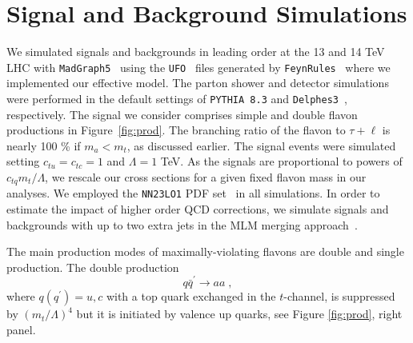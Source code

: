 \documentclass[prd,amsfonts,onecolumn,superscriptaddress,aps,nofootinbib,11pt]{revtex4-1}
\begin{document}
\section{Signal and Background Simulations}\label{backs}

We simulated signals and backgrounds in leading order at the 13 and 14 TeV LHC with \texttt{MadGraph5}~\cite{Alwall:2014hca, Frederix:2018nkq} using the \texttt{UFO}~\cite{Degrande:2011ua} files generated by \texttt{FeynRules}~\cite{Alloul:2013bka} where we implemented our effective model.  The parton shower and detector simulations were performed in the default settings of \texttt{PYTHIA 8.3} \cite{Bierlich:2022pfr} and \texttt{Delphes3}~\cite{deFavereau:2013fsa}, respectively. The signal we consider comprises simple and double flavon productions in Figure~\ref{fig:prod}. The branching ratio of the flavon to $\tau+\ell$ is nearly 100 \% if $m_a<m_t$, as discussed earlier. The signal events were simulated setting $c_{tu}=c_{tc}=1$ and $\Lambda=1$ TeV. As the signals are proportional to powers of $c_{tq} m_t/\Lambda$, we rescale our cross sections for a given fixed flavon mass in our analyses. We employed the \texttt{NN23LO1} PDF set~\cite{Ball_2017} in all simulations. In order to estimate the impact of higher order QCD corrections, we simulate signals and backgrounds with up to two extra jets in the MLM merging approach~\cite{Mangano_2007}.





The main production modes of maximally-violating flavons are double and single production.
The double production
\begin{equation}
    q\bar{q}^\prime \to aa\; ,
\end{equation}
where $q(q^\prime)=u,c$ with a top quark exchanged in the $t$-channel, is suppressed by $(m_t/\Lambda)^4$ but it is initiated by valence up quarks, see Figure \ref{fig:prod}, right panel. 
\end{document}
